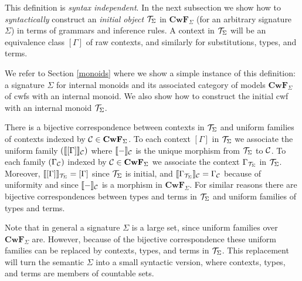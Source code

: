 \documentclass{lmcs}
\def\Cwf{\mathbf{CwF}}
\begin{document}
This definition is {\em syntax independent}. In the next subsection we show how to {\em syntactically} construct an {\em initial object} ${\mathcal T}_{\Sigma}$ in $\Cwf_{\Sigma}$ (for an arbitrary signature $\Sigma$) in terms of grammars and inference rules. A context in ${\mathcal T}_{\Sigma}$ will be an equivalence class $[ \Gamma ]$ of raw contexts, and similarly for substitutions, types, and terms.

We refer to Section \ref{monoids} where we show a simple instance of this definition: a signature $\Sigma$ for internal monoids and its associated category of models $\Cwf_\Sigma$ of cwfs with an internal monoid. We also show how to construct the initial cwf with an internal monoid ${\mathcal T}_\Sigma$.

There is a bijective correspondence between contexts in ${\mathcal T}_\Sigma$ and uniform families of contexts
indexed by $\C \in \Cwf_\Sigma$. To each context $[ \Gamma ]$ in ${\mathcal T}_\Sigma$ we associate the uniform family $(\llbracket  [ \Gamma ]  \rrbracket_{\mathcal C})$ where $\llbracket - \rrbracket_{\mathcal C}$ is the unique morphism from ${\mathcal T}_\Sigma$ to ${\mathcal C}$. To each family $(\Gamma_{\mathcal C})$ indexed by $\C \in \Cwf_\Sigma$ we associate the context $\Gamma_{{\mathcal T}_\Sigma}$ in ${\mathcal T}_\Sigma$. Moreover, $\llbracket  [ \Gamma ]  \rrbracket_{{\mathcal T}_\Sigma} = [ \Gamma ]$ since ${\mathcal T}_\Sigma$ is initial, and  $\llbracket  {\Gamma_{{\mathcal T}_\Sigma}} \rrbracket_{\mathcal C}  = \Gamma_{\mathcal C}$ because of uniformity and since $\llbracket - \rrbracket_{\mathcal C}$ is a morphism in $\Cwf_{\Sigma}$. For similar reasons there are bijective correspondences between types and terms in ${\mathcal T}_\Sigma$ and uniform families of types and terms.

\begin{remark}
Note that in general a signature $\Sigma$ is a large set, since uniform families over $\Cwf_\Sigma$ are. However, because of the bijective correspondence these uniform families can be replaced by contexts, types, and terms in ${\mathcal T}_\Sigma$. This replacement will turn the semantic $\Sigma$ into a small syntactic version, where contexts, types, and terms are members of countable sets.
\end{remark}
\end{document}
